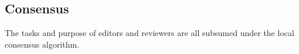 \documentclass[14pt]{article}
\begin{document}
\subsection{Consensus}
The tasks and purpose of editors and reviewers are all subsumed under the local consensus algorithm.






















\end{document}
